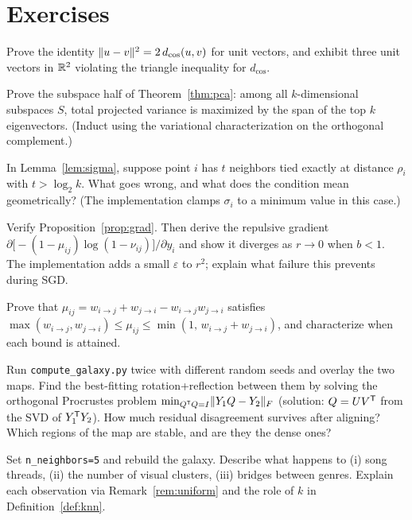 \section*{Exercises}

\begin{exercise}
Prove the identity $\lVert u - v\rVert^2 = 2\,d_{\cos}(u,v)$ for unit vectors, and
exhibit three unit vectors in $\mathbb{R}^2$ violating the triangle inequality for
$d_{\cos}$.
\end{exercise}

\begin{exercise}
Prove the subspace half of Theorem~\ref{thm:pca}: among all $k$-dimensional
subspaces $S$, total projected variance is maximized by the span of the top
$k$ eigenvectors. (Induct using the variational characterization on the
orthogonal complement.)
\end{exercise}

\begin{exercise}
In Lemma~\ref{lem:sigma}, suppose point $i$ has $t$ neighbors tied exactly at
distance $\rho_i$ with $t > \log_2 k$. What goes wrong, and what does the
condition mean geometrically? (The implementation clamps $\sigma_i$ to a
minimum value in this case.)
\end{exercise}

\begin{exercise}
Verify Proposition~\ref{prop:grad}. Then derive the repulsive gradient
$\partial\big[-(1-\mu_{ij})\log(1 - \nu_{ij})\big] / \partial y_i$ and show
it diverges as $r \to 0$ when $b < 1$. The implementation adds a small
$\varepsilon$ to $r^2$; explain what failure this prevents during SGD.
\end{exercise}

\begin{exercise}
Prove that $\mu_{ij} = w_{i\to j} + w_{j \to i} - w_{i \to j} w_{j \to i}$
satisfies $\max(w_{i \to j}, w_{j \to i}) \le \mu_{ij} \le
\min(1,\, w_{i \to j} + w_{j \to i})$, and characterize when each bound is
attained.
\end{exercise}

\begin{exercise}[computational]
Run \texttt{compute\_galaxy.py} twice with different random seeds and overlay
the two maps. Find the best-fitting rotation+reflection between them by
solving the orthogonal Procrustes problem
$\min_{Q^{\mathsf{T}} Q = I} \lVert Y_1 Q - Y_2\rVert_F$ (solution: $Q = UV^{\mathsf{T}}$ from the SVD
of $Y_1^{\mathsf{T}} Y_2$). How much residual disagreement survives after aligning?
Which regions of the map are stable, and are they the dense ones?
\end{exercise}

\begin{exercise}[computational]
Set \texttt{n\_neighbors=5} and rebuild the galaxy. Describe what happens to
(i) song threads, (ii) the number of visual clusters, (iii) bridges between
genres. Explain each observation via Remark~\ref{rem:uniform} and the role of
$k$ in Definition~\ref{def:knn}.
\end{exercise}
